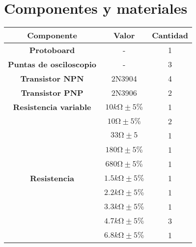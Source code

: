 
\section{Componentes y materiales}

\begin{table}[H]
    \centering
    \begin{tabular}{|c|c|c|}
        \hline
        \textbf{Componente}                                 & \textbf{Valor}          & \textbf{Cantidad} \\\hline
        \textbf{Protoboard}                                 & -                       & 1                 \\\hline
        \textbf{Puntas de osciloscopio}                     & -                       & 3                 \\\hline
        \textbf{Transistor NPN}                             & 2N3904                  & 4                 \\\hline
        \textbf{Transistor PNP}                             & 2N3906                  & 2                 \\\hline
        \textbf{Resistencia variable}                       & $10k\si{\ohm}\pm5 \% $  & 1                 \\\hline
        \multirow{17}{5cm}{\centering \textbf{Resistencia}} & $10\si{\ohm}\pm5 \% $   & 2                 \\
                                                            & $33\si{\ohm}\pm5$       & 1                 \\
                                                            & $180\si{\ohm}\pm5 \% $  & 1                 \\
                                                            & $680\si{\ohm}\pm5 \% $  & 1                 \\
                                                            & $1.5k\si{\ohm}\pm5 \% $ & 1                 \\
                                                            & $2.2k\si{\ohm}\pm5 \% $ & 1                 \\
                                                            & $3.3k\si{\ohm}\pm5 \% $ & 1                 \\
                                                            & $4.7k\si{\ohm}\pm5 \% $ & 3                 \\
                                                            & $6.8k\si{\ohm}\pm5 \% $ & 1                 \\

\end{tabular}
\end{table}
